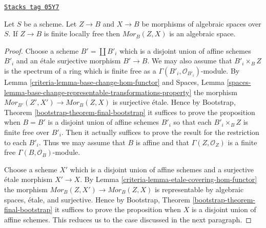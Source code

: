 \begin{proposition}
\label{criteria-proposition-hom-functor-algebraic-space}
\href{https://stacks.math.columbia.edu/tag/05Y7}{\texttt{Stacks tag 05Y7}}

Let $S$ be a scheme. Let $Z \to B$ and $X \to B$ be morphisms of
algebraic spaces over $S$. If $Z \to B$ is finite locally free
then $\mathit{Mor}_B(Z, X)$ is an algebraic space.
\end{proposition}

\begin{proof}

Choose a scheme $B' = \coprod B'_i$ which is a disjoint union of
affine schemes $B'_i$ and an \'etale surjective morphism $B' \to B$.
We may also assume that $B'_i \times_B Z$ is the spectrum of a ring
which is finite free as a $\Gamma(B'_i, \mathcal{O}_{B'_i})$-module.
By
Lemma \ref{criteria-lemma-base-change-hom-functor}
and
Spaces, Lemma
\ref{spaces-lemma-base-change-representable-transformations-property}
the morphism $\mathit{Mor}_{B'}(Z', X') \to \mathit{Mor}_B(Z, X)$
is surjective \'etale. Hence by
Bootstrap, Theorem \ref{bootstrap-theorem-final-bootstrap}
it suffices to prove the proposition when $B = B'$ is a disjoint union of
affine schemes $B'_i$ so that each $B'_i \times_B Z$ is finite free
over $B'_i$. Then it actually suffices to prove the result for the restriction
to each $B'_i$. Thus we may assume that $B$ is affine and that
$\Gamma(Z, \mathcal{O}_Z)$ is a finite free $\Gamma(B, \mathcal{O}_B)$-module.

\medskip\noindent
Choose a scheme $X'$ which is a disjoint union of affine schemes and
a surjective \'etale morphism $X' \to X$. By
Lemma \ref{criteria-lemma-etale-covering-hom-functor}
the morphism $\mathit{Mor}_B(Z, X') \to \mathit{Mor}_B(Z, X)$
is representable by algebraic spaces, \'etale, and surjective.
Hence by
Bootstrap, Theorem \ref{bootstrap-theorem-final-bootstrap}
it suffices to prove the proposition when $X$ is a disjoint union
of affine schemes. This reduces us to the case discussed in the next
paragraph.


\end{proof}
